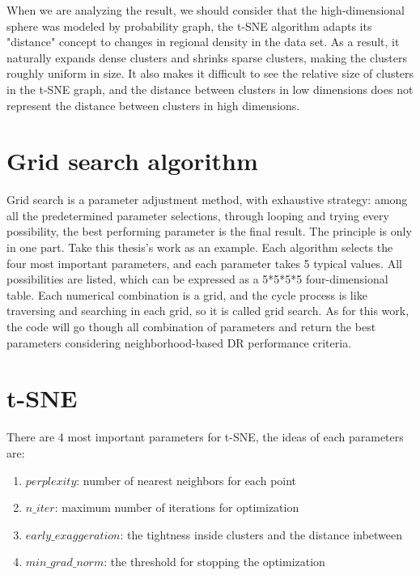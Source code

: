 \noindent When we are analyzing the result, we should consider that the high-dimensional sphere was modeled by probability graph, the t-SNE algorithm adapts its "distance" concept to changes in regional density in the data set. As a result, it naturally expands dense clusters and shrinks sparse clusters, making the clusters roughly uniform in size. It also makes it difficult to see the relative size of clusters in the t-SNE graph, and the distance between clusters in low dimensions does not represent the distance between clusters in high dimensions.

\section{Grid search algorithm}

Grid search is a parameter adjustment method, with exhaustive strategy: among all the predetermined parameter selections, through looping and trying every possibility, the best performing parameter is the final result. The principle is only in one part. Take this thesis's work as an example. Each algorithm selects the four most important parameters, and each parameter takes 5 typical values. All possibilities are listed, which can be expressed as a 5*5*5*5 four-dimensional table. Each numerical combination is a grid, and the cycle process is like traversing and searching in each grid, so it is called grid search. As for this work, the code will go though all combination of parameters and return the best parameters considering neighborhood-based DR performance criteria.

\section{t-SNE}
There are 4 most important parameters for t-SNE, the ideas of each parameters are: 

\begin{enumerate}[1)]
\item $perplexity$: number of nearest neighbors for each point
\item $n\_iter$: maximum number of iterations for optimization
\item $early\_exaggeration$: the tightness inside clusters and the distance inbetween
\item $min\_grad\_norm$: the threshold for stopping the optimization 
\end{enumerate}\\



